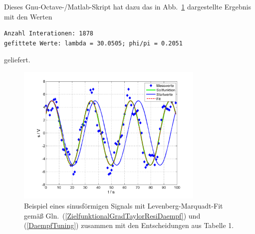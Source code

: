 Dieses Gnu-Octave-/Matlab-Skript hat dazu das in Abb.~\ref{LSoptiExampleSinusFitted} dargestellte Ergebnis mit den Werten
\begin{verbatim}
Anzahl Interationen: 1878
gefittete Werte: lambda = 30.0505; phi/pi = 0.2051
\end{verbatim}
geliefert.
\begin{figure}
\begin{center}
\includegraphics[width=0.8\textwidth, angle = 0]{03_vorlesung/media/pltSS_nonlin_leastsquare_sin_zB2.png}
\end{center}
\caption{Beispiel eines sinusförmigen Signals mit Levenberg-Marquadt-Fit gemäß
Gln.~(\ref{ZielfunktionalGradTaylorResiDaempf}) und (\ref{DaempfTuning}) zusammen mit
den Entscheidungen aus Tabelle 1.\label{LSoptiExampleSinusFitted}}
\end{figure}


